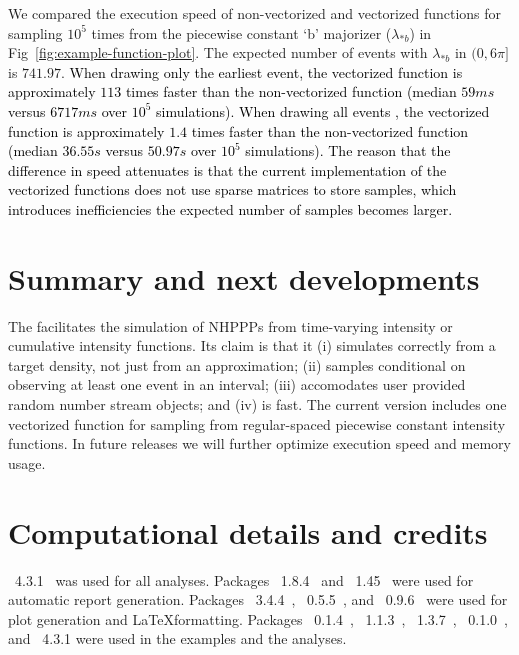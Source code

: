 \documentclass[article,nojss]{jss}\usepackage[]{graphicx}\usepackage[]{xcolor}
\newcommand{\red}[1]{\textcolor{black}{#1}}
\begin{document}
We compared the execution speed of non-vectorized and vectorized functions for sampling $\ensuremath{10^{5}}$ times from the piecewise constant `b' majorizer ($\lambda_{*b}$) in Fig~\ref{fig:example-function-plot}. The expected number of events with $\lambda_{*b}$ in $(0, 6\pi]$ is
$741.97$.
%
\red{When drawing only the earliest event, the vectorized function is approximately
$113$ times faster than the non-vectorized function (median $59 ms$ versus $6717 ms$ over $\ensuremath{10^{5}}$ simulations).
%
When drawing all events , the vectorized function is approximately $1.4$ times faster than the non-vectorized function (median $36.55 s$ versus $50.97 s$ over $\ensuremath{10^{5}}$ simulations). The reason that the difference in speed attenuates is that the current implementation of the vectorized functions does not use sparse matrices to store samples, which introduces inefficiencies the  expected number of samples becomes larger.}



\section{Summary and next developments} \label{sec:summary}

The  facilitates the simulation of NHPPPs from time-varying intensity or cumulative intensity functions. Its claim is that it (i) simulates correctly from a target density, not just from an approximation; (ii) samples conditional on observing at least one event in an interval; (iii) accomodates user provided random number stream objects; and (iv) is fast. The current version includes one vectorized function for sampling from regular-spaced piecewise constant intensity functions. In future releases we will further optimize execution speed and memory usage.



\section*{Computational details and credits}

~4.3.1~\citep{R-program}
was used for all analyses.
Packages
~{1.8.4}~\citep{xtable-package} and
~{1.45}~\citep{knitr-package}
were used for automatic report generation. Packages
~{3.4.4}~\citep{ggplot2-package},
~{0.5.5}~\citep{ggridges-package}, and
~{0.9.6}~\citep{latex2exp-package}
were used for plot generation and \LaTeX formatting.
Packages
~{0.1.4}~\citep{nhppp-package},
~{1.1.3}~\citep{bench-package},
~{1.3.7}~\citep{rstream-package},
~{0.1.0}~\citep{otinference-package}, and
~{4.3.1}
were used in the examples and the analyses.
\end{document}
